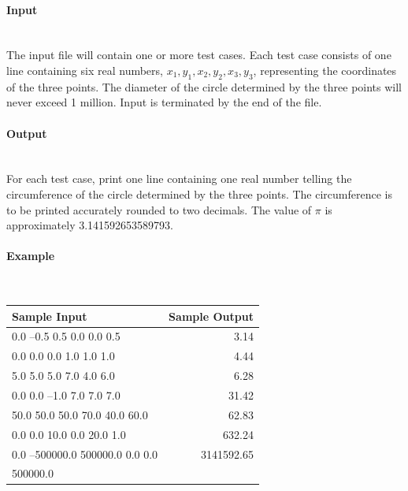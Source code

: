 \documentclass{article}
\begin{document}
\paragraph{Input} \mbox{} \\

The input file will contain one or more test cases. Each test case consists of one line containing six real
numbers, $x_1, y_1, x_2, y_2, x_3, y_3$, representing the coordinates of the three points. The diameter of the circle
determined by the three points will never exceed 1 million. Input is terminated by the end of the file.

\paragraph{Output}\mbox{} \\

For each test case, print one line containing one real number telling the circumference of the circle
determined by the three points. The circumference is to be printed accurately rounded to two decimals. The value of $\pi$ is approximately 3.141592653589793.


\paragraph{Example}\mbox{} \\

\begin{table}[h]
    \centering
    \begin{tabular}{|l|r|}
        \hline
        \textbf{Sample Input} & \textbf{Sample Output} \\
        \hline
        0.0 –0.5 0.5 0.0 0.0 0.5    & 3.14  \\ 
        0.0 0.0 0.0 1.0 1.0 1.0    & 4.44 \\ 
        5.0 5.0 5.0 7.0 4.0 6.0    & 6.28 \\ 
        0.0 0.0 –1.0 7.0 7.0 7.0    & 31.42 \\ 
        50.0 50.0 50.0 70.0 40.0 60.0 & 62.83  \\ 
        0.0 0.0 10.0 0.0 20.0 1.0    & 632.24 \\ 
        0.0 –500000.0 500000.0 0.0 0.0 & 3141592.65\\
        500000.0 & \\
         \hline
    \end{tabular}
\end{table}
\end{document}

